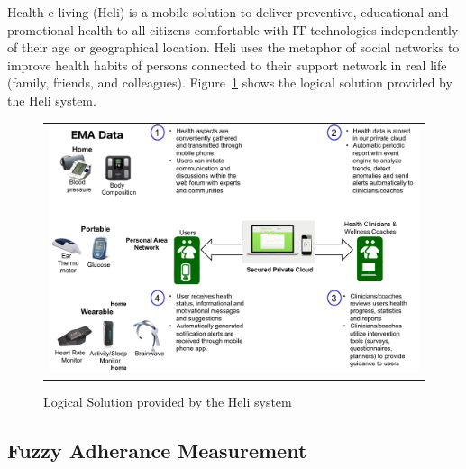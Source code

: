 \documentclass{llncs}
\begin{document}
 Health-e-living (Heli)\cite{rem2012} is a mobile solution to deliver preventive, educational and promotional health to all citizens comfortable with IT technologies independently of their age or geographical location. Heli uses the metaphor of social networks to improve health habits of persons connected to their support network in real life (family, friends, and colleagues). Figure~\ref{Fig.heli} shows the logical solution provided by the Heli system.
\begin{figure}
  \begin{center}
  \begin{tabular}{c}
    \includegraphics[scale=0.5]{LogicalSolutionNow.png}\\
    \end{tabular}
    \caption{Logical Solution provided by the Heli system\cite{rem2012}}
     \label{Fig.heli}
\end{center}
\end{figure} 

\subsection{Fuzzy  Adherance Measurement}
\end{document}
